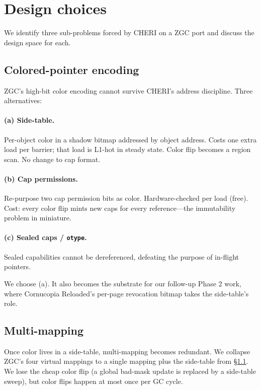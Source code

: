 \documentclass[acmsmall,nonacm]{acmart}
\begin{document}
\section{Design choices}
\label{sec:design}

We identify three sub-problems forced by CHERI on a ZGC port and
discuss the design space for each.

\subsection{Colored-pointer encoding}
\label{sec:design:color}

ZGC's high-bit color encoding cannot survive CHERI's address
discipline. Three alternatives:

\paragraph{(a) Side-table.} Per-object color in a shadow bitmap addressed
by object address. Costs one extra load per barrier; that load is
L1-hot in steady state. Color flip becomes a region scan. No change to
cap format.

\paragraph{(b) Cap permissions.} Re-purpose two cap permission bits as
color. Hardware-checked per load (free). Cost: every color flip mints
new caps for every reference—the immutability problem in miniature.

\paragraph{(c) Sealed caps / \texttt{otype}.} Sealed capabilities cannot
be dereferenced, defeating the purpose of in-flight pointers.

We choose (a). It also becomes the substrate for our follow-up Phase
2 work, where Cornucopia Reloaded's per-page revocation bitmap takes
the side-table's role.

\subsection{Multi-mapping}
\label{sec:design:multimap}

Once color lives in a side-table, multi-mapping becomes redundant. We
collapse ZGC's four virtual mappings to a single mapping plus the
side-table from \S\ref{sec:design:color}. We lose the cheap color flip
(a global bad-mask update is replaced by a side-table sweep), but
color flips happen at most once per GC cycle.
\end{document}
